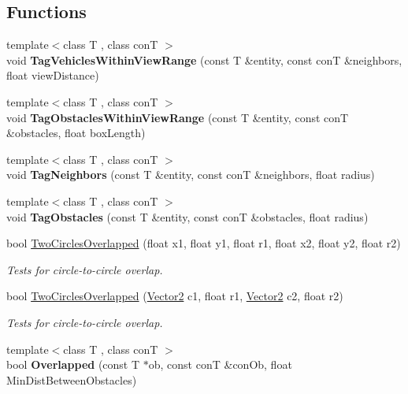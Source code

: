 \subsection*{Functions}
\begin{DoxyCompactItemize}
\item 
\hypertarget{namespacesteer_a7d9e2cbba7557cca0a07982a322c89b2}{{\footnotesize template$<$class T , class con\-T $>$ }\\void {\bfseries Tag\-Vehicles\-Within\-View\-Range} (const T \&entity, const con\-T \&neighbors, float view\-Distance)}\label{namespacesteer_a7d9e2cbba7557cca0a07982a322c89b2}

\item 
\hypertarget{namespacesteer_a46ccbc9d2a2089bcfb651fb70c9f9dc5}{{\footnotesize template$<$class T , class con\-T $>$ }\\void {\bfseries Tag\-Obstacles\-Within\-View\-Range} (const T \&entity, const con\-T \&obstacles, float box\-Length)}\label{namespacesteer_a46ccbc9d2a2089bcfb651fb70c9f9dc5}

\item 
\hypertarget{namespacesteer_af99cdd11937d42eb54aea68706b9447c}{{\footnotesize template$<$class T , class con\-T $>$ }\\void {\bfseries Tag\-Neighbors} (const T \&entity, const con\-T \&neighbors, float radius)}\label{namespacesteer_af99cdd11937d42eb54aea68706b9447c}

\item 
\hypertarget{namespacesteer_af755c362f3897acf3c563709fb08e478}{{\footnotesize template$<$class T , class con\-T $>$ }\\void {\bfseries Tag\-Obstacles} (const T \&entity, const con\-T \&obstacles, float radius)}\label{namespacesteer_af755c362f3897acf3c563709fb08e478}

\item 
bool \hyperlink{namespacesteer_ac9a8bb3e99f2db51489abc61f130cf0f}{Two\-Circles\-Overlapped} (float x1, float y1, float r1, float x2, float y2, float r2)
\begin{DoxyCompactList}\small\item\em Tests for circle-\/to-\/circle overlap. \end{DoxyCompactList}\item 
bool \hyperlink{namespacesteer_abc9be81ad47052543fb184597934f48f}{Two\-Circles\-Overlapped} (\hyperlink{structsteer_1_1_vector2}{Vector2} c1, float r1, \hyperlink{structsteer_1_1_vector2}{Vector2} c2, float r2)
\begin{DoxyCompactList}\small\item\em Tests for circle-\/to-\/circle overlap. \end{DoxyCompactList}\item 
\hypertarget{namespacesteer_a275ca98cd49e296b5e438b940607baeb}{{\footnotesize template$<$class T , class con\-T $>$ }\\bool {\bfseries Overlapped} (const T $\ast$ob, const con\-T \&con\-Ob, float Min\-Dist\-Between\-Obstacles)}\label{namespacesteer_a275ca98cd49e296b5e438b940607baeb}


\end{DoxyCompactItemize}
